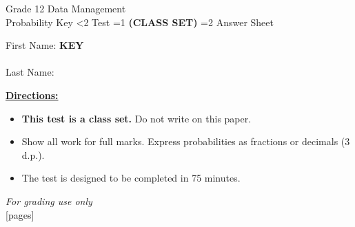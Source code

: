 \documentclass[addpoints]{exam}
\newcommand{\event}{Probability}
\newcommand{\tournament}{}
\def\type{0}
\begin{document}
\begin{center}
    {\huge Grade 12 Data Management \\ \event
    \ifprintanswers \space Key
    \else \space \ifnum\type<2 Test \fi \ifnum\type=1 \textbf{(CLASS SET)} \fi
          \ifnum\type=2 Answer Sheet \fi
    \fi \\ \vspace{3mm}\tournament\vspace{1mm}}
\end{center}

\vspace{.25\textheight}

\begin{center}
    First Name: \ifprintanswers
    \underline{\hspace{3.5cm}}\textbf{KEY}\underline{\hspace{5.5cm}}\\\vspace{5mm}
    \else \underline{\hspace{10cm}}\\ \vspace{5mm} \fi
    Last Name: \underline{\hspace{10cm}}\\ \vspace{5mm}
\end{center}

\noindent\textbf{\underline{Directions:}}
\begin{itemize}
    \ifnum\type=1 \item \textbf{This test is a class set.} Do not write on this paper. \fi
    \item Show all work for full marks. Express probabilities as fractions or decimals (3 d.p.).
    \item The test is designed to be completed in 75 minutes.
\end{itemize}
\begin{center}
\textit{For grading use only}\\
[pages]
\end{center}
\end{document}
